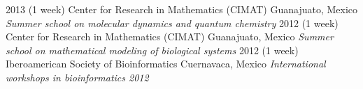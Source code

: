 \documentclass[]{friggeri-cv} %
\begin{document}
\begin{entrylist}
\entry
{2013}
{(1 week)}
{Center for Research in Mathematics (CIMAT)}
{Guanajuato, Mexico}
{{\normalsize\emph{Summer school on molecular dynamics and quantum chemistry}}}
{\vspace{-3mm}}
\entry
{2012}
{(1 week)}
{Center for Research in Mathematics (CIMAT)}
{Guanajuato, Mexico}
{{\normalsize\emph{Summer school on mathematical modeling of biological systems}}}
{\vspace{-3mm}}
\entry
{2012}
{(1 week)}
{Iberoamerican Society of Bioinformatics}
{Cuernavaca, Mexico}
{{\normalsize\emph{International workshops in bioinformatics 2012}}}
{\vspace{-3mm}}
\end{entrylist}

\end{document}

